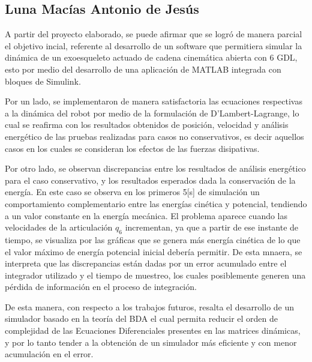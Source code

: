 
\subsection{Luna Macías Antonio de Jesús}
    \noindent A partir del proyecto elaborado, se puede afirmar que se logró 
    de manera parcial el objetivo incial, referente al desarrollo 
    de un software que permitiera simular la dinámica de un exoesqueleto 
    actuado de cadena cinemática abierta con 6 GDL, esto por medio del desarrollo de 
    una aplicación de MATLAB integrada con bloques de Simulink.
    
    Por un lado, se implementaron de manera satisfactoria las ecuaciones 
    respectivas a la dinámica del robot por medio de la formulación de 
    D'Lambert-Lagrange, lo cual se reafirma con los resultados 
    obtenidos de posición, velocidad y análisis energético de las 
    pruebas realizadas para casos no conservativos, es decir 
    aquellos casos en los cuales se consideran los efectos de las fuerzas 
    disipativas. 

    Por otro lado, se observan discrepancias entre los resultados de análisis 
    energético para el caso conservativo, y los resultados esperados dada la conservación de 
    la energía. En este caso se observa en los primeros 5[s] de simulación un comportamiento 
    complementario entre las energías cinética y potencial, tendiendo a un valor 
    constante en la energía mecánica. El problema aparece cuando las velocidades 
    de la articulación $q_6$ incrementan, ya que a partir de ese instante de tiempo, se 
    visualiza por las gráficas que se genera más energía cinética de lo que el valor 
    máximo de energía potencial inicial debería permitir. De esta mnaera, se interpreta 
    que las discrepancias están dadas por un error acumulado entre el integrador 
    utilizado y el tiempo de muestreo, los cuales posiblemente generen una pérdida de información 
    en el proceso de integración.

    De esta manera, con respecto a los trabajos futuros, resalta el desarrollo de un 
    simulador basado en la teoría del BDA el cual permita reducir el orden de 
    complejidad de las Ecuaciones Diferenciales presentes en las matrices dinámicas, 
    y por lo tanto tender a la obtención de un simulador más eficiente y con 
    menor acumulación en el error.

